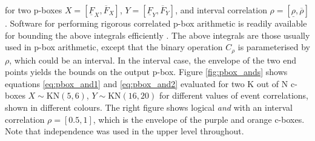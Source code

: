 \documentclass[runningheads]{llncs}
\begin{document}
\noindent for two p-boxes $X = [\underline{F}_{X}, \overline{F}_{X}]$, $Y = [\underline{F}_{Y}, \overline{F}_{Y}]$, and interval correlation $\rho = [\underline{\rho}, \overline{\rho}]$. Software for performing rigorous correlated p-box arithmetic is readily available for bounding the above integrals efficiently \cite{gray2021probabilityboundsanalysis}. The above integrals are those usually used in p-box arithmetic, except that the binary operation $C_{\rho}$ is parameterised by $\rho$, which could be an interval. In the interval case, the envelope of the two end points yields the bounds on the output p-box. Figure \ref{fig:pbox_ands} shows equations \eqref{eq:pbox_and1} and  \eqref{eq:pbox_and2} evaluated for two K out of N c-boxes \cite{ferson2014computing} $X \sim \text{KN}(5,6)$, $Y \sim \text{KN}(16,20)$ for different values of event correlations, shown in different colours. The right figure shows logical \textit{and} with an interval correlation $\rho = [0.5,1]$, which is the envelope of the purple and orange c-boxes. Note that independence was used in the upper level throughout.
\end{document}
